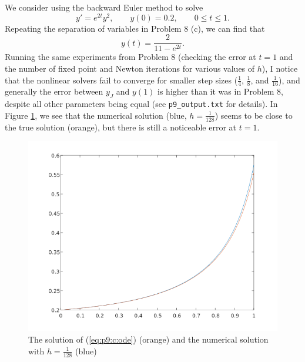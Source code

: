 \documentclass{homework}
\begin{document}
		\question 
		\begin{alphaparts}
			\questionpart We consider using the backward Euler method to solve
			\begin{equation}
				\label{eq:p9:c:ode}
				y' = e^{2t}y^2, \qquad y(0) = 0.2, \qquad 0\le t\le 1.
			\end{equation}
			Repeating the separation of variables in Problem 8 (c), we can find that
			\begin{equation}
				y(t) = \frac{2}{11 - e^{2t}}.
			\end{equation}
			Running the same experiments from Problem 8 (checking the error at $t = 1$ and the number of fixed point and Newton iterations for various values of $h$), I notice that the nonlinear solvers fail to converge for smaller step sizes ($\frac{1}{4}$, $\frac{1}{8}$, and $\frac{1}{16}$), and generally the error between $y_J$ and $y(1)$ is higher than it was in Problem 8, despite all other parameters being equal (see \verb*|p9_output.txt| for details). In Figure \ref{fig:p9c}, we see that the numerical solution (blue, $h=\frac{1}{128}$) seems to be close to the true solution (orange), but there is still a noticeable error at $t=1$.
			
			\begin{figure}[H]
				\centering
				\includegraphics[width={0.9\linewidth}]{plot_p9c.png}
				\caption{The solution of (\ref{eq:p9:c:ode}) (orange) and the numerical solution with $h=\frac{1}{128}$ (blue)}
				\label{fig:p9c}
			\end{figure}
			

\end{alphaparts}
\end{document}
